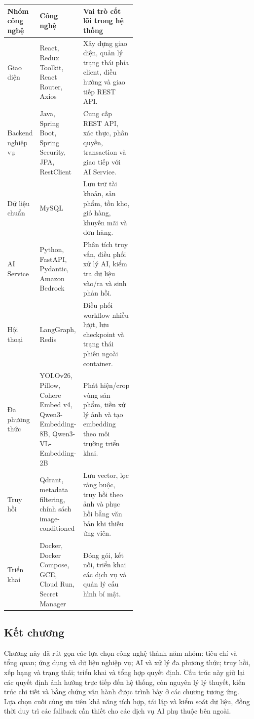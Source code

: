 \begin{breakabletable}
    \centering
    \caption{Công nghệ và vai trò cốt lõi}
    \label{tab:technology_core_roles}
    \renewcommand{\arraystretch}{1.15}
    \begin{tabularx}{\linewidth}{|p{0.22\linewidth}|p{0.30\linewidth}|X|}
        \hline
        \textbf{Nhóm công nghệ} & \textbf{Công nghệ} & \textbf{Vai trò cốt lõi trong hệ thống} \\ \hline
        Giao diện & React, Redux Toolkit, React Router, Axios & Xây dựng giao diện, quản lý trạng thái phía client, điều hướng và giao tiếp REST API. \\ \hline
        Backend nghiệp vụ & Java, Spring Boot, Spring Security, JPA, RestClient & Cung cấp REST API, xác thực, phân quyền, transaction và giao tiếp với AI Service. \\ \hline
        Dữ liệu chuẩn & MySQL & Lưu trữ tài khoản, sản phẩm, tồn kho, giỏ hàng, khuyến mãi và đơn hàng. \\ \hline
        AI Service & Python, FastAPI, Pydantic, Amazon Bedrock & Phân tích truy vấn, điều phối xử lý AI, kiểm tra dữ liệu vào/ra và sinh phản hồi. \\ \hline
        Hội thoại & LangGraph, Redis & Điều phối workflow nhiều lượt, lưu checkpoint và trạng thái phiên ngoài container. \\ \hline
        Đa phương thức & YOLOv26, Pillow, Cohere Embed v4, Qwen3-Embedding-8B, Qwen3-VL-Embedding-2B & Phát hiện/crop vùng sản phẩm, tiền xử lý ảnh và tạo embedding theo môi trường triển khai. \\ \hline
        Truy hồi & Qdrant, metadata filtering, chính sách image-conditioned & Lưu vector, lọc ràng buộc, truy hồi theo ảnh và phục hồi bằng văn bản khi thiếu ứng viên. \\ \hline
        Triển khai & Docker, Docker Compose, GCE, Cloud Run, Secret Manager & Đóng gói, kết nối, triển khai các dịch vụ và quản lý cấu hình bí mật. \\ \hline
    \end{tabularx}
\end{breakabletable}

\subsection*{Kết chương}

Chương này đã rút gọn các lựa chọn công nghệ thành năm nhóm: tiêu chí và tổng quan;
ứng dụng và dữ liệu nghiệp vụ; AI và xử lý đa phương thức; truy hồi, xếp hạng và
trạng thái; triển khai và tổng hợp quyết định. Cấu trúc này giữ lại các quyết định
ảnh hưởng trực tiếp đến hệ thống, còn nguyên lý lý thuyết, kiến trúc chi tiết và bằng
chứng vận hành được trình bày ở các chương tương ứng. Lựa chọn cuối cùng ưu tiên khả
năng tích hợp, tái lập và kiểm soát dữ liệu, đồng thời duy trì các fallback cần thiết
cho các dịch vụ AI phụ thuộc bên ngoài.
